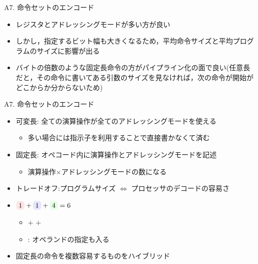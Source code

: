 \documentclass[dvipdfmx]{beamer}
\begin{document}
	\begin{frame}{A7. 命令セットのエンコード}
		\begin{itemize}
			\item レジスタとアドレッシングモードが多い方が良い
			\item しかし，指定するビット幅も大きくなるため，平均命令サイズと平均プログラムのサイズに影響が出る
			\item バイトの倍数のような固定長命令の方がパイプライン化の面で良い(任意長だと，その命令に書いてある引数のサイズを見なければ，次の命令が開始がどこからか分からないため)
		\end{itemize}
	\end{frame}

	\begin{frame}{A7. 命令セットのエンコード}
		\begin{itemize}
			\item 可変長: 全ての演算操作が全てのアドレッシングモードを使える
				\begin{itemize}
					\item 多い場合には指示子を利用することで直接書かなくて済む
				\end{itemize}
			\item 固定長: オペコード内に演算操作とアドレッシングモードを記述
				\begin{itemize}
					\item 演算操作$\times$アドレッシングモードの数になる
				\end{itemize}
			\item トレードオフ:プログラムサイズ $\Leftrightarrow$ プロセッサのデコードの容易さ
				
			\item $\highlight[red]{1} + \highlight[blue]{1} + \highlight[green]{4} = 6$
				\begin{itemize}
					\item {} $+$  $+$ 
					\item {}: オペランドの指定も入る
				\end{itemize}
			\item 固定長の命令を複数容易するものをハイブリッド
		\end{itemize}
	\end{frame}
\end{document}
